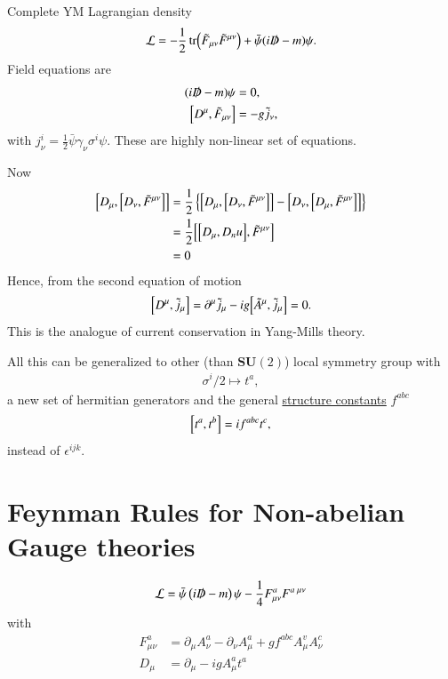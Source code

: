 Complete YM Lagrangian density
\begin{align}
   \mathcal{L} = - \frac{1}{2} \tr (\tilde{F}_{\mu\nu} \tilde{F}^{\mu\nu}) + \bar\psi ( i \slashed{D} - m) \psi.
\end{align}
Field equations are 
\begin{align*}
   (i\slashed{D} - m) \psi  &= 0, \\
   \comm{D^\mu}{\tilde{F}_{\mu\nu}} &= -g \tilde{j}_\nu,
\end{align*}
with $j_\nu^i =\frac{1}{2} \bar\psi \gamma_\nu \sigma^i \psi $. These are highly non-linear set of equations.

Now
\begin{align*}
   \comm{D_\mu}{\comm{D_\nu}{\tilde{F}^{\mu\nu}}} &= \frac{1}{2} \left\{ \comm{D_\mu}{\comm{D_\nu}{\tilde{F}^{\mu\nu}}}  - \comm{D_\nu}{\comm{D_\mu}{\tilde{F}^{\mu\nu}}}\right\} \\
                                                  &= \frac{1}{2} \comm{\comm{D_\mu}{D_nu}}{\tilde{F}^{\mu\nu}}  \\
                                                  &= 0
\end{align*}
Hence, from the second equation of motion
\begin{align}
   \comm{D^\mu}{\tilde{j}_\mu} = \partial^\mu \tilde{j}_\mu - ig \comm{\tilde{A}^\mu}{\tilde{j}_\mu} = 0.
\end{align}
This is the analogue of current conservation in Yang-Mills theory.

All this can be generalized to other (than $\mathbf{SU}(2)$) local symmetry group with 
\begin{align*}
   \sigma^i / 2 \mapsto t^a,
\end{align*}
a new set of hermitian generators and the general \underline{structure constants} $f^{abc}$
\begin{align}
   \comm{t^a}{t^b} = i f^{abc} t^c,
\end{align}
instead of $\epsilon^{ijk}$.

\section{Feynman Rules for Non-abelian Gauge theories}
\begin{align}
   \mathcal{L} = \bar{\psi} \left( i \slashed{D} - m \right)\psi - \frac{1}{4} F_{\mu\nu}^a F^{a\; \mu\nu}
\end{align}
with 
\begin{align*}
   F^a_{\mu\nu} &= \partial_\mu A_\nu^a - \partial_\nu A^a_\mu + g f^{abc} A_\mu^v A_\nu^c  \\
   D_\mu & = \partial_\mu - igA_\mu^a t^a
\end{align*}

